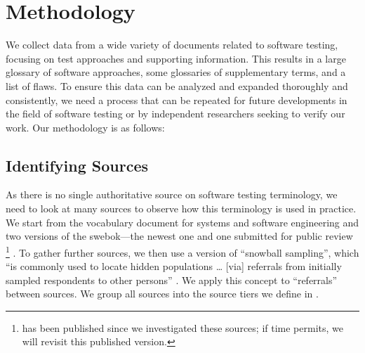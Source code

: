 \section{Methodology}\label{methodology}

We collect data %
from a wide variety of documents related to software testing, focusing on
test approaches and supporting information. This results in a large
glossary of software approaches, some glossaries of supplementary terms, and a
list of flaws. To ensure this data can be analyzed and expanded thoroughly and
consistently, we need a process that can be repeated for future developments in
the field of software testing or by independent researchers seeking to verify
our work. Our methodology is as follows:



\subsection{Identifying Sources}\label{ident-sources}
As there is no single authoritative source on software testing terminology,
we need to look at many sources to observe how this terminology is used in
practice.
We start from the vocabulary document for systems and software engineering%
\citep{IEEE2017} and two versions of the \acf{swebok}---the newest
one \citep{SWEBOK2014} and one submitted for public review%
\footnote{%
     \citet{SWEBOK2024} has been published since we investigated
    these sources; if time permits, we will revisit this published version.
}
\citep{SWEBOK2024}. To gather further sources, we then use a version of
``snowball sampling'',
which ``is commonly used to locate hidden populations \dots{} [via] referrals
from initially sampled respondents to other persons'' \citep{Johnson2014}. We
apply this concept to ``referrals'' between sources. \addTextEx{} We group all
sources into the source tiers we define in \listAllSrcs{}.

